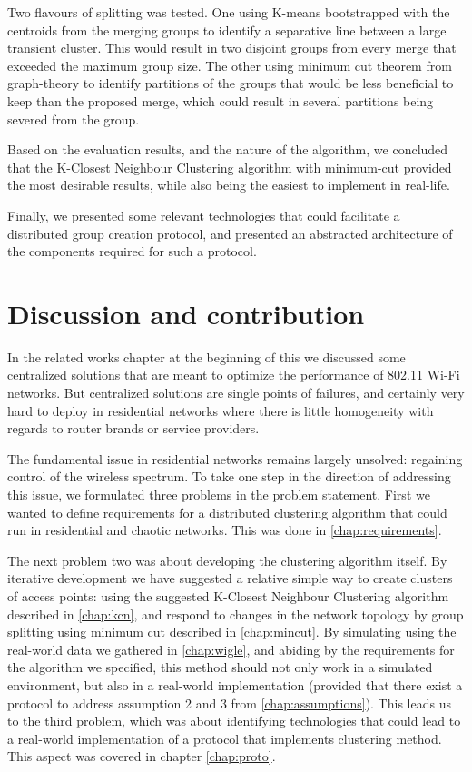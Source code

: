 Two flavours of splitting was tested. One using K-means bootstrapped with the centroids from the merging groups to identify a separative line between a large transient cluster. This would result in
two disjoint groups from every merge that exceeded the maximum group size. The other using minimum cut theorem from graph-theory to identify partitions of the groups that would be less beneficial to keep than the proposed merge, which could result in several partitions being severed from the group. 

Based on the evaluation results, and the nature of the algorithm, we concluded that the K-Closest Neighbour Clustering algorithm with minimum-cut provided the most desirable results, while
also being the easiest to implement in real-life. 

Finally, we presented some relevant technologies that could facilitate a distributed group creation protocol, and presented an abstracted architecture of the components required for such a protocol.

\section{Discussion and contribution}
In the related works chapter at the beginning of this we discussed some centralized solutions that are meant 
to optimize the performance of 802.11 Wi-Fi networks. But centralized solutions are single points of failures, and certainly very hard to deploy in residential networks where there
is little homogeneity with regards to router brands or service providers. 

The fundamental issue in residential networks remains largely unsolved: regaining control of the wireless spectrum. To take one step in the direction of addressing this issue,
we formulated three problems in the problem statement. First we wanted to define requirements for a distributed clustering algorithm that could run in residential and chaotic networks.
This was done in \ref{chap:requirements}.

The next problem two was about developing the clustering algorithm itself. By iterative development we have suggested a relative simple way to create clusters of access points: using the suggested K-Closest Neighbour Clustering algorithm described in \ref{chap:kcn}, and respond to changes in the network topology by group splitting using minimum cut described in \ref{chap:mincut}. By simulating using the real-world data we gathered in \ref{chap:wigle}, and abiding by the requirements for the algorithm we specified, this method should not only work in a simulated environment, but also in a real-world implementation (provided that there exist a protocol to address assumption 2 and 3 from \ref{chap:assumptions}). This leads us to the third problem, which was about identifying
technologies that could lead to a real-world implementation of a protocol that implements clustering method. This aspect was covered in chapter \ref{chap:proto}.


